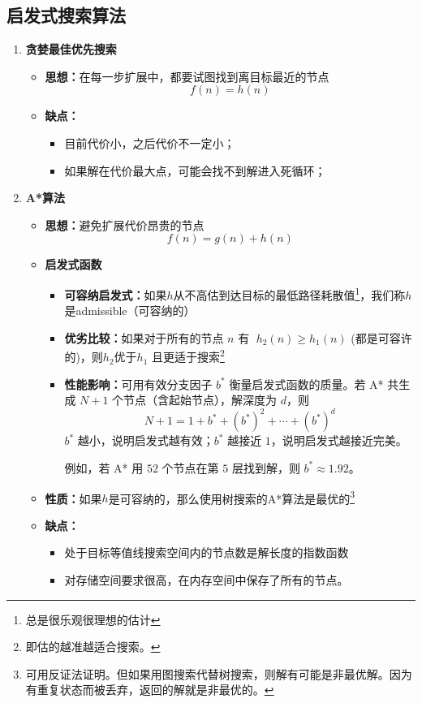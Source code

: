 \documentclass[../main.tex]{subfiles}
\begin{document}
\subsection{启发式搜索算法}\label{sec:heuristic-search}
\begin{enumerate}
    \item \textbf{贪婪最佳优先搜索}
    \begin{itemize}
        \item \textbf{思想：}在每一步扩展中，都要试图找到离目标最近的节点
        $$f(n)=h(n)$$
        \item \textbf{缺点：}
        \begin{itemize}
            \item 目前代价小，之后代价不一定小；
            \item 如果解在代价最大点，可能会找不到解进入死循环；
        \end{itemize}
    \end{itemize}
    \item \textbf{A*算法}
    \begin{itemize}
        \item \textbf{思想：}避免扩展代价昂贵的节点
                $$f(n)=g(n)+h(n)$$
        \item \textbf{启发式函数}
        \begin{itemize}
            \item \textbf{可容纳启发式：}如果$h$从不高估到达目标的最低路径耗散值\footnote{总是很乐观很理想的估计}，我们称$h$是admissible（可容纳的）
            \item \textbf{优劣比较：}如果对于所有的节点 \( n \) 有 \( \;{h}_{2}\left( n\right)  \geq  {h}_{1}\left( n\right) \) (都是可容许的)，则$h_2 $优于$ h_1$ 且更适于搜索\footnote{即估的越准越适合搜索。}
            \item \textbf{性能影响：}可用有效分支因子 $b^*$ 衡量启发式函数的质量。若 A* 共生成 $N+1$ 个节点（含起始节点），解深度为 $d$，则
            $$
            N+1=1+b^*+(b^*)^2+\cdots+(b^*)^d
            $$
            $b^*$ 越小，说明启发式越有效；$b^*$ 越接近 $1$，说明启发式越接近完美。  
            
            {\small\kaishu 例如，若 A* 用 $52$ 个节点在第 $5$ 层找到解，则 $b^*\approx 1.92$。}
        \end{itemize}
        \item \textbf{性质：}如果$h$是可容纳的，那么使用树搜索的A*算法是最优的\footnote{可用反证法证明。但如果用图搜索代替树搜索，则解有可能是非最优解。因为有重复状态而被丢弃，返回的解就是非最优的。}
        \item \textbf{缺点：}
        \begin{itemize}
            \item 处于目标等值线搜索空间内的节点数是解长度的指数函数
            \item 对存储空间要求很高，在内存空间中保存了所有的节点。
        \end{itemize}


\end{itemize}
\end{enumerate}
\end{document}
